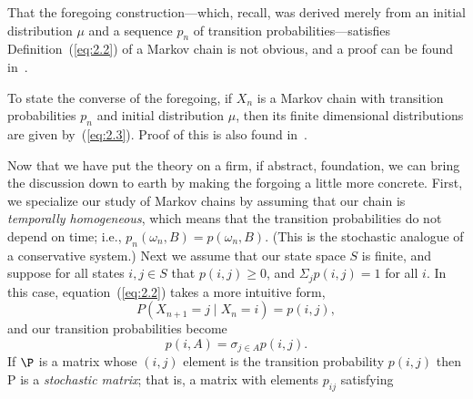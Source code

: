 That the foregoing construction---which, recall, was derived merely from an
initial distribution $\mu$ and a sequence $p_n$ of transition
probabilities---satisfies Definition~(\ref{eq:2.2}) of a Markov chain is not
obvious, and a proof can be found in~\cite{Durret:1996}.

To state the converse of the foregoing, if $X_n$ is a Markov chain with
transition probabilities $p_n$ and initial distribution $\mu$, then its finite
dimensional distributions are given by~(\ref{eq:2.3}). Proof of this is also found
in~\cite{Durret:1996}. 

Now that we have put the theory on a firm, if abstract, foundation, we can bring
the discussion down to earth by making the forgoing a little more
concrete. First, we specialize our study of Markov chains by assuming that our
chain is \emph{temporally homogeneous}, which means that the transition
probabilities do not depend on time; i.e., 
$p_n(\omega_n, B) = p(\omega_n, B)$. (This is the stochastic analogue of a
conservative system.) 
Next we assume that our state space $S$ is finite, and suppose for all states
$i,j \in S$ that $p(i, j) \geq 0$, and $\Sigma_j p(i, j) = 1$ for all $i$. In
this case, equation~(\ref{eq:2.2}) takes a more intuitive form,
\[
P(X_{n+1}=j \mid X_n = i) =p(i,j),
\]
and our transition probabilities become
\[
p(i,A) = \sigma_{j\in A} p(i,j).
\]
If $\P$ is a matrix whose $(i, j)$ element is the transition probability 
$p(i, j)$ then P is a \emph{stochastic matrix}; that is, a matrix with elements
$p_{ij}$ satisfying 
